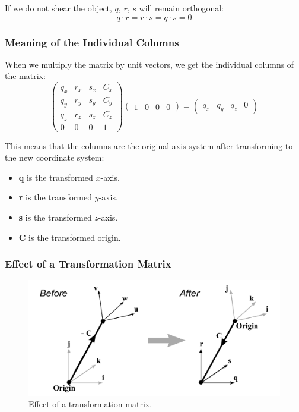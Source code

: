\documentclass[11pt]{article}
\begin{document}
If we do not shear the object, $q$, $r$, $s$ will remain orthogonal:
\[
  q \cdot r = r \cdot s = q \cdot s = 0  
\]

\subsubsection{Meaning of the Individual Columns}
When we multiply the matrix by unit vectors, we get the individual columns of the matrix:
\[
  \begin{pmatrix}
    q_x & r_x & s_x & C_x \\
    q_y & r_y & s_y & C_y \\
    q_z & r_z & s_z & C_z \\
    0 & 0 & 0 & 1
  \end{pmatrix}
  \begin{pmatrix} 1 & 0 & 0 & 0 \end{pmatrix}
  =
  \begin{pmatrix} q_x & q_y & q_z & 0 \end{pmatrix}
\]

This means that the columns are the original axis system after transforming to the new coordinate system:
\begin{itemize}
  \item \textbf{q} is the transformed $x$-axis.
  \item \textbf{r} is the transformed $y$-axis.
  \item \textbf{s} is the transformed $z$-axis.
  \item \textbf{C} is the transformed origin.
\end{itemize}

\subsubsection{Effect of a Transformation Matrix}
\begin{figure}[h]
  \caption{Effect of a transformation matrix.}
  \includegraphics[scale=0.2]{effecttransform}
  \centering
\end{figure}
\end{document}
